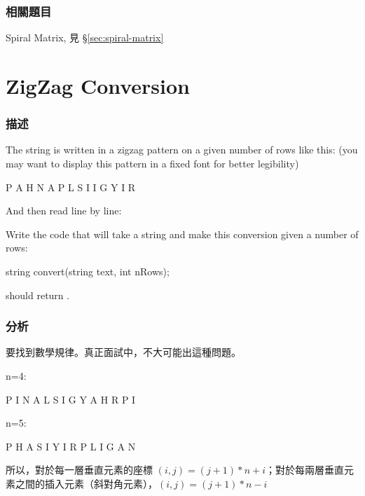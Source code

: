 \subsubsection{相關題目}
\begindot
\item Spiral Matrix, 見 \S \ref{sec:spiral-matrix}
\myenddot


\section{ZigZag Conversion} %
\label{sec:zigzag-conversion}


\subsubsection{描述}
The string  is written in a zigzag pattern on a given number of rows like this: (you may want to display this pattern in a fixed font for better legibility)

\begin{Code}
P   A   H   N
A P L S I I G
Y   I   R
\end{Code}

And then read line by line: 

Write the code that will take a string and make this conversion given a number of rows:
\begin{Code}
string convert(string text, int nRows);
\end{Code}
 should return .


\subsubsection{分析}
要找到數學規律。真正面試中，不大可能出這種問題。

n=4:
\begin{Code}
P     I     N
A   L S   I G
Y A   H R
P     I
\end{Code}

n=5:
\begin{Code}
P       H
A     S I
Y   I   R
P L     I  G
A       N
\end{Code}

所以，對於每一層垂直元素的座標 $(i,j)= (j+1 )*n +i$；對於每兩層垂直元素之間的插入元素（斜對角元素），$(i,j)= (j+1)*n -i$


